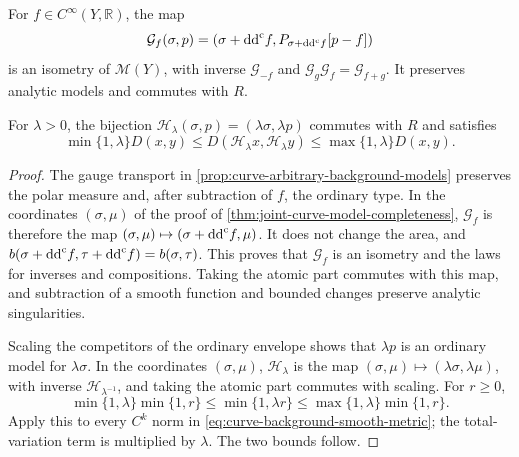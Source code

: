 \begin{corollary}\label{cor:joint-curve-model-gauge}
For $f\in C^\infty(Y,\mathbb R)$, the map
\[
 \mathcal G_f(\sigma,p)
   =(\sigma+\mathrm{dd}^{\mathrm{c}} f,P_{\sigma+\mathrm{dd}^{\mathrm{c}} f}[p-f])
\]
is an isometry of $\mathscr M(Y)$, with inverse $\mathcal G_{-f}$ and $\mathcal G_g\mathcal G_f=\mathcal G_{f+g}$. It preserves analytic models and commutes with $R$.

For $\lambda>0$, the bijection $\mathcal H_\lambda(\sigma,p)=(\lambda\sigma,\lambda p)$ commutes with $R$ and satisfies
\[
 \min\{1,\lambda\}D(x,y)
 \leq D(\mathcal H_\lambda x,\mathcal H_\lambda y)
 \leq\max\{1,\lambda\}D(x,y).
\]
\end{corollary}
\begin{proof}
The gauge transport in \cref{prop:curve-arbitrary-background-models} preserves the polar measure and, after subtraction of $f$, the ordinary type. In the coordinates $(\sigma,\mu)$ of the proof of \cref{thm:joint-curve-model-completeness}, $\mathcal G_f$ is therefore the map $(\sigma,\mu)\mapsto(\sigma+\mathrm{dd}^{\mathrm{c}} f,\mu)$. It does not change the area, and $b(\sigma+\mathrm{dd}^{\mathrm{c}} f,\tau+\mathrm{dd}^{\mathrm{c}} f)=b(\sigma,\tau)$. This proves that $\mathcal G_f$ is an isometry and the laws for inverses and compositions. Taking the atomic part commutes with this map, and subtraction of a smooth function and bounded changes preserve analytic singularities.

Scaling the competitors of the ordinary envelope shows that $\lambda p$ is an ordinary model for $\lambda\sigma$. In the coordinates $(\sigma,\mu)$, $\mathcal H_\lambda$ is the map $(\sigma,\mu)\mapsto(\lambda\sigma,\lambda\mu)$, with inverse $\mathcal H_{\lambda^{-1}}$, and taking the atomic part commutes with scaling. For $r\geq0$,
\[
 \min\{1,\lambda\}\min\{1,r\}
 \leq\min\{1,\lambda r\}
 \leq\max\{1,\lambda\}\min\{1,r\}.
\]
Apply this to every $C^k$ norm in \eqref{eq:curve-background-smooth-metric}; the total-variation term is multiplied by $\lambda$. The two bounds follow.
\end{proof}
